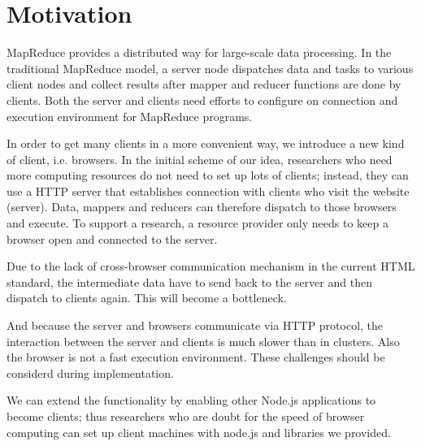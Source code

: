 \section{Motivation}

MapReduce\cite{mapreduce} provides a distributed way for large-scale data processing. In the traditional MapReduce model, a server node dispatches data and tasks to various client nodes and collect results after mapper and reducer functions are done by clients. Both the server and clients need efforts to configure on connection and execution environment for MapReduce programs.

In order to get many clients in a more convenient way, we introduce a new kind of client, i.e. browsers.
In the initial scheme of our idea, researchers who need more computing resources do not need to set up lots of clients; instead, they can use a HTTP server that establishes connection with clients who visit the website (server).
Data, mappers and reducers can therefore dispatch to those browsers and execute.
To support a research, a resource provider only needs to keep a browser open and connected to the server.

Due to the lack of cross-browser communication mechanism in the current HTML standard, the intermediate data have to send back to the server and then dispatch to clients again. This will become a bottleneck.

And because the server and browsers communicate via HTTP protocol, the interaction between the server and clients is much slower than in clusters.
Also the browser is not a fast execution environment. These challenges should be considerd during implementation.

We can extend the functionality by enabling other Node.js applications to become clients; thus researchers who are doubt for the speed of browser computing can set up client machines with node.js and libraries we provided.